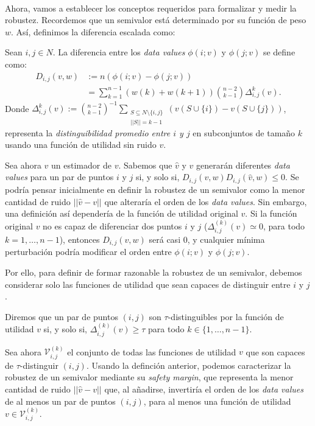 \

Ahora, vamos a establecer los conceptos requeridos para
formalizar y medir la robustez. Recordemos que un semivalor
está determinado por su función de peso $w$. Así, definimos
la diferencia escalada como:


\begin{definition}
  Sean $i,j \in N$. La diferencia
  entre los \textit{data values} $\phi(i;v)$ y $\phi(j;v)$
  se define como:
  \begin{align*}
    D_{i,j}(v,w)&:= n(\phi(i;v)-\phi(j;v))\\
    &=\sum_{k=1}^{n-1} (w(k)+w(k+1)) \binom{n-2}{k-1}
    \Delta_{i,j}^k(v).
  \end{align*}
  Donde $\Delta_{i,j}^k(v):=\binom{n-2}{k-1}^{-1} \sum_{\substack{
    S \subseteq N \setminus \{i,j\} \\ ||S||=k-1}}
    (v(S \cup \{i\})-v(S \cup \{j\}))$,
  representa la \emph{distinguibilidad promedio entre $i$ y $j$} en
  subconjuntos de tamaño $k$ usando una función de utilidad
  sin ruido $v$.
\end{definition}

Sea ahora $\hat{v}$ un estimador de $v$. Sabemos que
$\hat{v}$ y $v$ generarán diferentes \textit{data values}
para un par de puntos $i$ y $j$ si, y solo si,
$D_{i,j}(v,w)D_{i,j}(\hat{v},w) \leq 0$. Se podría pensar
inicialmente en definir la robustez de un semivalor como
la menor cantidad de ruido $||\hat{v}-v||$ que alteraría
el orden de los \textit{data values}. Sin embargo, una
definición así dependería de la función de utilidad original $v$.
Si la función original $v$ no es capaz de diferenciar
dos puntos $i$ y $j$ ($\Delta_{i,j}^{(k)}(v)\simeq 0$, para
todo $k=1,\dots,n-1$), entonces $D_{i,j}(v,w)$ será
casi 0, y cualquier mínima perturbación podría 
modificar el orden entre $\phi(i;v)$ y $\phi(j;v)$. 

Por ello, para definir de formar razonable la
robustez de un semivalor, debemos considerar solo las
funciones de utilidad que sean capaces de distinguir
entre $i$ y $j$.

\begin{definition}
  Diremos que un par de puntos $(i,j)$ son $\tau$-distinguibles por
  la función de utilidad $v$ si, y solo si, $\Delta_{i,j}^{(k)}(v) \geq \tau$
  para todo $k \in \{1,\dots,n-1\}$.
\end{definition}

Sea ahora $\mathcal{V}_{i,j}^{(k)}$ el conjunto de todas las funciones
de utilidad $v$ que son capaces de $\tau$-distinguir $(i,j)$. 
Usando la definción anterior, podemos caracterizar la robustez de
un semivalor mediante su \textit{safety margin}, que representa la
menor cantidad de ruido $||\hat{v} - v||$ que, al añadirse,
invertiría el orden de los \textit{data values} de al menos un
par de puntos $(i,j)$, para al menos una función de utilidad $v \in
\mathcal{V}_{i,j}^{(k)}$.

